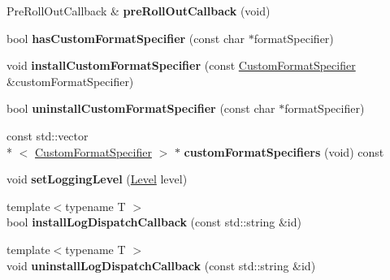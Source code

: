 \begin{DoxyCompactItemize}
\item 
\hypertarget{classel_1_1base_1_1Storage_a90a3a886437746acae51cacbd5731572}{Pre\-Roll\-Out\-Callback \& {\bfseries pre\-Roll\-Out\-Callback} (void)}\label{classel_1_1base_1_1Storage_a90a3a886437746acae51cacbd5731572}

\item 
\hypertarget{classel_1_1base_1_1Storage_ae953cb6e8acafa96c5c1ab2f4826a4a5}{bool {\bfseries has\-Custom\-Format\-Specifier} (const char $\ast$format\-Specifier)}\label{classel_1_1base_1_1Storage_ae953cb6e8acafa96c5c1ab2f4826a4a5}

\item 
\hypertarget{classel_1_1base_1_1Storage_a355aac8191ab98869a52394cc868a315}{void {\bfseries install\-Custom\-Format\-Specifier} (const \hyperlink{classel_1_1CustomFormatSpecifier}{Custom\-Format\-Specifier} \&custom\-Format\-Specifier)}\label{classel_1_1base_1_1Storage_a355aac8191ab98869a52394cc868a315}

\item 
\hypertarget{classel_1_1base_1_1Storage_a68e1d3e0b657418ddb0f62f60fe979d2}{bool {\bfseries uninstall\-Custom\-Format\-Specifier} (const char $\ast$format\-Specifier)}\label{classel_1_1base_1_1Storage_a68e1d3e0b657418ddb0f62f60fe979d2}

\item 
\hypertarget{classel_1_1base_1_1Storage_aaafbc69cac920ec79f60e1cf4c2c12d6}{const std\-::vector\\*
$<$ \hyperlink{classel_1_1CustomFormatSpecifier}{Custom\-Format\-Specifier} $>$ $\ast$ {\bfseries custom\-Format\-Specifiers} (void) const }\label{classel_1_1base_1_1Storage_aaafbc69cac920ec79f60e1cf4c2c12d6}

\item 
\hypertarget{classel_1_1base_1_1Storage_a163473357c32184769e8edd993c8b440}{void {\bfseries set\-Logging\-Level} (\hyperlink{namespaceel_ab0ac6091262344c52dd2d3ad099e8e36}{Level} level)}\label{classel_1_1base_1_1Storage_a163473357c32184769e8edd993c8b440}

\item 
\hypertarget{classel_1_1base_1_1Storage_aec36c8e770c0ac354e74d57aba1cfa03}{{\footnotesize template$<$typename T $>$ }\\bool {\bfseries install\-Log\-Dispatch\-Callback} (const std\-::string \&id)}\label{classel_1_1base_1_1Storage_aec36c8e770c0ac354e74d57aba1cfa03}

\item 
\hypertarget{classel_1_1base_1_1Storage_a34c2c9f8abff647e22e1ee0b52357f88}{{\footnotesize template$<$typename T $>$ }\\void {\bfseries uninstall\-Log\-Dispatch\-Callback} (const std\-::string \&id)}\label{classel_1_1base_1_1Storage_a34c2c9f8abff647e22e1ee0b52357f88}


\end{DoxyCompactItemize}
